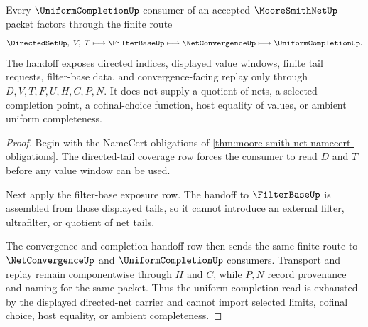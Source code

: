 \begin{theorem}\label{thm:moore-smith-net-uniform-completion-handoff}
Every $\UniformCompletionUp$ consumer of an accepted $\MooreSmithNetUp$ packet factors through the finite route
$$
\DirectedSetUp,\; V,\; T \longmapsto \FilterBaseUp \longmapsto \NetConvergenceUp \longmapsto \UniformCompletionUp .
$$
The handoff exposes directed indices, displayed value windows, finite tail requests, filter-base data, and convergence-facing replay only through $D,V,T,F,U,H,C,P,N$. It does not supply a quotient of nets, a selected completion point, a cofinal-choice function, host equality of values, or ambient uniform completeness.
\end{theorem}
\begin{proof}
Begin with the NameCert obligations of \autoref{thm:moore-smith-net-namecert-obligations}. The directed-tail coverage row forces the consumer to read $D$ and $T$ before any value window can be used.

Next apply the filter-base exposure row. The handoff to $\FilterBaseUp$ is assembled from those displayed tails, so it cannot introduce an external filter, ultrafilter, or quotient of net tails.

The convergence and completion handoff row then sends the same finite route to $\NetConvergenceUp$ and $\UniformCompletionUp$ consumers. Transport and replay remain componentwise through $H$ and $C$, while $P,N$ record provenance and naming for the same packet. Thus the uniform-completion read is exhausted by the displayed directed-net carrier and cannot import selected limits, cofinal choice, host equality, or ambient completeness.
\end{proof}


\begin{closurestatus}{\MooreSmithNetUp}
  \theoryclosure{\seedClosure}
  \formalstatus{\unformalizedV}
\end{closurestatus}
